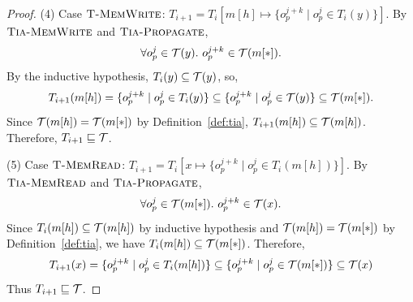 \begin{proof}
    \vspace{1ex}
    \noindent
    (4) Case $\textsc{T-MemWrite}$:
    $T_{i+1} = T_i\left[m[h] \mapsto \{o_p^{j+k} \mid o_p^{j} \in T_i(y)\}\right]$.
    By $\textsc{Tia-MemWrite}$ and $\textsc{Tia-Propagate}$,
    \[
    \forall o_p^j \in \mathcal{T}(y).\ o_p^{j+k} \in \mathcal{T}(m[*]).
    \]
    By the inductive hypothesis, $T_i(y) \subseteq \mathcal{T}(y)$, so,
    \[
    T_{i+1}(m[h]) = \{o_p^{j+k} \mid o_p^{j} \in T_i(y)\} \subseteq \{o_p^{j+k} \mid o_p^{j} \in \mathcal{T}(y)\} \subseteq \mathcal{T}(m[*]).
    \]
    Since $\mathcal{T}(m[h]) = \mathcal{T}(m[*])$ by Definition~\ref{def:tia}, $T_{i+1}(m[h])\subseteq\mathcal{T}(m[h])$.
    Therefore, $T_{i+1} \sqsubseteq \mathcal{T}$.

    \vspace{1ex}
    \noindent
    (5) Case $\textsc{T-MemRead}$:
    $T_{i+1} = T_i\left[x \mapsto \{o_p^{j+k} \mid o_p^{j} \in T_i(m[h])\}\right]$.
    By $\textsc{Tia-MemRead}$ and $\textsc{Tia-Propagate}$,
    \[
    \forall o_p^j \in \mathcal{T}(m[*]).\ o_p^{j+k} \in \mathcal{T}(x).
    \]
    Since $T_i(m[h]) \subseteq \mathcal{T}(m[h])$ by inductive hypothesis and $\mathcal{T}(m[h]) = \mathcal{T}(m[*])$ by Definition~\ref{def:tia}, we have $T_i(m[h]) \subseteq \mathcal{T}(m[*])$.
    Therefore,
    \[
    T_{i+1}(x) = \{o_p^{j+k} \mid o_p^{j} \in T_i(m[h])\} \subseteq \{o_p^{j+k} \mid o_p^{j} \in \mathcal{T}(m[*])\} \subseteq \mathcal{T}(x)
    \]
    Thus $T_{i+1} \sqsubseteq \mathcal{T}$.
\end{proof}
